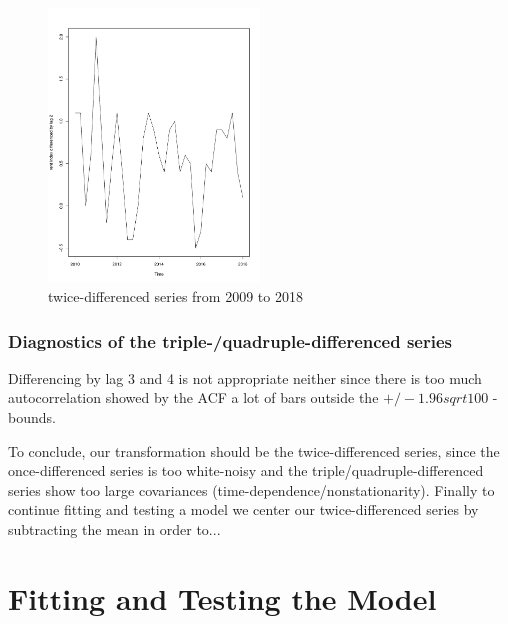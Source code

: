 \documentclass[11pt,a4paper]{article}
\begin{document}
\begin{figure}[!htb]
\centering
\includegraphics[angle=0,
width=0.5\textwidth]{diff2_testset}
\caption{twice-differenced series from 2009 to 2018
\label{fig:diff2_testset}}
\end{figure} 

\subsubsection{Diagnostics of the triple-/quadruple-differenced series}
Differencing by lag 3 and 4 is not appropriate neither since there is too much autocorrelation showed by the ACF a lot of bars outside the $+/-1.96sqrt{100}$ - bounds.

To conclude, our transformation should be the twice-differenced series, since the once-differenced series is too white-noisy and the triple/quadruple-differenced series show too large covariances (time-dependence/nonstationarity). Finally to continue fitting and testing a model we center our twice-differenced series by subtracting the mean in order to...

\section{Fitting and Testing the Model} \label{Fitting and Testing the Model}
\end{document}
